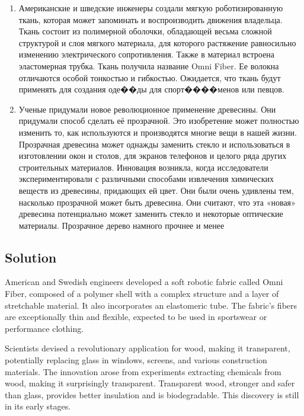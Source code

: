 \begin{enumerate}
      \item Американские и шведские инженеры создали мягкую роботизированную ткань, которая
            может запоминать и воспроизводить движения владельца. Ткань состоит из полимерной
            оболочки, обладающей весьма сложной структурой и слоя мягкого материала, для которого
            растяжение равносильно изменению электрического сопротивления. Также в материал
            встроена эластомерная трубка. Ткань получила название Omni Fiber. Ее волокна отличаются
            особой тонкостью и гибкостью. Ожидается, что ткань будут применять для создания оде��ды
            для спорт����менов или певцов.

      \item Ученые придумали новое революционное применение древесины. Они придумали способ
            сделать её прозрачной. Это изобретение может полностью изменить то, как используются и
            производятся многие вещи в нашей жизни. Прозрачная древесина может однажды заменить
            стекло и использоваться в изготовлении окон и столов, для экранов телефонов и целого ряда
            других строительных материалов. Инновация возникла, когда исследователи
            экспериментировали с различными способами извлечения химических веществ из
            древесины, придающих ей цвет. Они были очень удивлены тем, насколько прозрачной может
            быть древесина. Они считают, что эта «новая» древесина потенциально может заменить
            стекло и некоторые оптические материалы. Прозрачное дерево намного прочнее и менее
\end{enumerate}

\subsection*{Solution}
American and Swedish engineers developed a soft robotic fabric called Omni Fiber, composed of a polymer shell with a complex structure and a layer of stretchable material. It also incorporates an elastomeric tube. The fabric's fibers are exceptionally thin and flexible, expected to be used in sportswear or performance clothing.

Scientists devised a revolutionary application for wood, making it transparent, potentially replacing glass in windows, screens, and various construction materials. The innovation arose from experiments extracting chemicals from wood, making it surprisingly transparent. Transparent wood, stronger and safer than glass, provides better insulation and is biodegradable. This discovery is still in its early stages.

